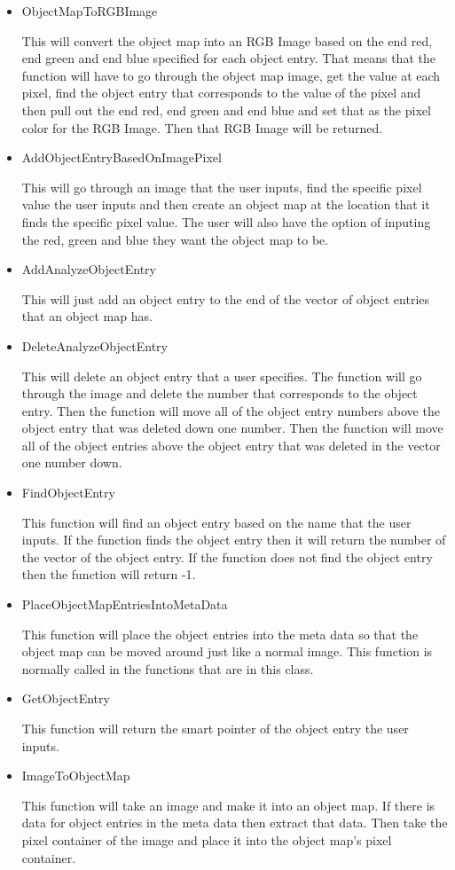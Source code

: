 \documentclass{InsightArticle}
\begin{document}
\begin{itemize}
\begin{itemize}
\item ObjectMapToRGBImage

This will convert the object map into an RGB Image based on the end red, end green and end blue specified for each object entry.  That means that the function will have to go through the object map image, get the value at each pixel, find the object entry that corresponds to the value of the pixel and then pull out the end red, end green and end blue and set that as the pixel color for the RGB Image.  Then that RGB Image will be returned.

\item AddObjectEntryBasedOnImagePixel

This will go through an image that the user inputs, find the specific pixel value the user inputs and then create an object map at the location that it finds the specific pixel value.  The user will also have the option of inputing the red, green and blue they want the object map to be.

\item AddAnalyzeObjectEntry

This will just add an object entry to the end of the vector of object entries that an object map has.

\item DeleteAnalyzeObjectEntry

This will delete an object entry that a user specifies.  The function will go through the image and delete the number that corresponds to the object entry.  Then the function will move all of the object entry numbers above the object entry that was deleted down one number.  Then the function will move all of the object entries above the object entry that was deleted in the vector one number down.

\item FindObjectEntry

This function will find an object entry based on the name that the user inputs.  If the function finds the object entry then it will return the number of the vector of the object entry.  If the function does not find the object entry then the function will return -1.

\item PlaceObjectMapEntriesIntoMetaData

This function will place the object entries into the meta data so that the object map can be moved around just like a normal image.  This function is normally called in the functions that are in this class.

\item GetObjectEntry

This function will return the smart pointer of the object entry the user inputs.

\item ImageToObjectMap

This function will take an image and make it into an object map.  If there is data for object entries in the meta data then extract that data.  Then take the pixel container of the image and place it into the object map's pixel container.
\end{itemize}
\end{itemize}
\end{document}
